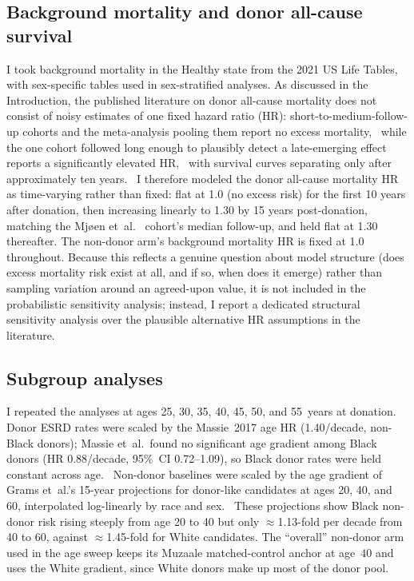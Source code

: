 \subsection{Background mortality and donor all-cause survival}
I took background mortality in the Healthy state from the 2021 US Life Tables,~\cite{cdc_2023} with sex-specific tables used in sex-stratified analyses. As discussed in the Introduction, the published literature on donor all-cause mortality does not consist of noisy estimates of one fixed hazard ratio (HR): short-to-medium-follow-up cohorts and the meta-analysis pooling them report no excess mortality,~\cite{okeeffe_mid-_2018} while the one cohort followed long enough to plausibly detect a late-emerging effect reports a significantly elevated HR,~\cite{mjoeen_long-term_2014} with survival curves separating only after approximately ten years.~\cite{mjoeen_reply,okeeffe_reply_2018} I therefore modeled the donor all-cause mortality HR as time-varying rather than fixed: flat at 1.0 (no excess risk) for the first 10 years after donation, then increasing linearly to 1.30 by 15 years post-donation, matching the Mjøen et~al.~\cite{mjoeen_long-term_2014} cohort's median follow-up, and held flat at 1.30 thereafter. The non-donor arm's background mortality HR is fixed at 1.0 throughout. Because this reflects a genuine question about model structure (does excess mortality risk exist at all, and if so, when does it emerge) rather than sampling variation around an agreed-upon value, it is not included in the probabilistic sensitivity analysis; instead, I report a dedicated structural sensitivity analysis over the plausible alternative HR assumptions in the literature.

\subsection{Subgroup analyses}
I repeated the analyses at ages 25, 30, 35, 40, 45, 50, and 55~years at donation. Donor ESRD rates were scaled by the Massie~2017 age HR (1.40/decade, non-Black donors); Massie et~al.\ found no significant age gradient among Black donors (HR 0.88/decade, 95\%~CI 0.72--1.09), so Black donor rates were held constant across age.~\cite{massie_quantifying_2017} Non-donor baselines were scaled by the age gradient of Grams et~al.'s 15-year projections for donor-like candidates at ages 20, 40, and 60, interpolated log-linearly by race and sex.~\cite{grams_kidney-failure_2016} These projections show Black non-donor risk rising steeply from age 20 to 40 but only $\approx$1.13-fold per decade from 40 to 60, against $\approx$1.45-fold for White candidates. The ``overall'' non-donor arm used in the age sweep keeps its Muzaale matched-control anchor at age~40 and uses the White gradient, since White donors make up most of the donor pool.

